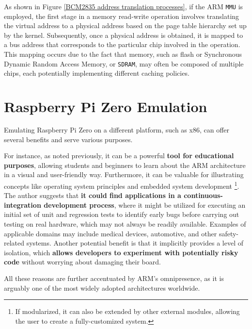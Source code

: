 \documentclass[english, ing, kiv, he, iso690numb, pdf]{fasthesis}
\begin{document}
	
	As shown in Figure \ref{BCM2835 address translation processes}, if the ARM \texttt{MMU} is employed, the first stage in a memory read-write operation involves translating the virtual address to a physical address based on the page table hierarchy set up by the kernel. Subsequently, once a physical address is obtained, it is mapped to a bus address that corresponds to the particular chip involved in the operation. This mapping occurs due to the fact that memory, such as flash or Synchronous Dynamic Random Access Memory, or \texttt{SDRAM}, may often be  composed of multiple chips, each potentially implementing different caching policies.
	
	\chapter{Raspberry Pi Zero Emulation}
	
	Emulating Raspberry Pi Zero on a different platform, such as x86, can offer several benefits and serve various purposes.
	
	For instance, as noted previously, it can be a powerful \textbf{tool for educational purposes}, allowing students and beginners to learn about the ARM architecture in a visual and user-friendly way. Furthermore, it can be valuable for illustrating concepts like operating system principles and embedded system development \footnote{If modularized, it can also be extended by other external modules, allowing the user to create a fully-customized system.}. The author suggests that \textbf{it could find applications in a continuous-integration development process}, where it might be utilized for executing an initial set of unit and regression tests to identify early bugs before carrying out testing on real hardware, which may not always be readily available. Examples of applicable domains may include medical devices, automotive, and other safety-related systems. Another potential benefit is that it implicitly provides a level of isolation, which \textbf{allows developers to experiment with potentially risky code} without worrying about damaging their board.
	
	All these reasons are further accentuated by ARM's omnipresence, as it is arguably one of the most widely adopted architectures worldwide.
	
	\newpage
	
\end{document}
